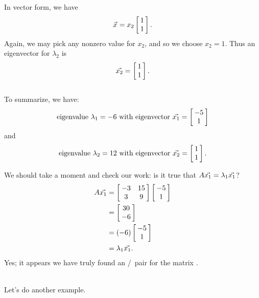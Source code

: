 {In vector form, we have $$\vx = x_2\bmx{c}1\\1\emx.$$ Again, we may pick any nonzero value for $x_2$, and so we choose $x_2 = 1$. Thus an eigenvector for $\lambda_2$ is $$\vx[2] = \bmx{c}1\\1\emx.$$ \\

To summarize, we have: $$\text{eigenvalue } \lambda_1 = -6 \text{ with  \ev\ } \vx[1] = \bmx{c}-5\\1\emx$$ and $$\text{\el\ } \lambda_2 = 12 \text{ with \ev\ } \vx[2] = \bmx{c}1\\1\emx.$$

We should take a moment and check our work: is it true that $\tta\vx[1] = \lambda_1\vx[1]$?
\begin{align*}
\tta\vx[1]	&=	\bmx{cc}-3&15\\3&9\emx\bmx{c}-5\\1\emx \\
						&=	\bmx{c} 30\\-6\emx\\
						&=	(-6)\bmx{c} -5\\1\emx \\
						&=	\lambda_1\vx[1].
\end{align*}
Yes; it appears we have truly found an \el/\ev\ pair for the matrix \tta.} \\ %

Let's do another example.\\


